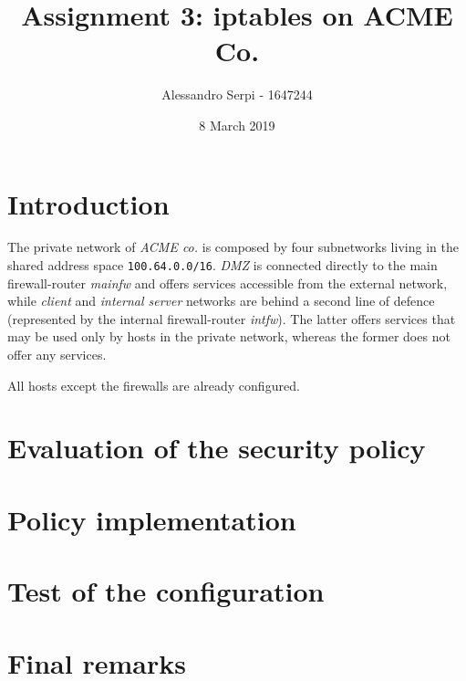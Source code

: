 \documentclass[draft]{homework}
\title{Assignment 3: iptables on ACME Co.}
\author{Alessandro Serpi - 1647244}
\date{8 March 2019}
\newcommand{\client}{\textit{client}\xspace}
\newcommand{\dmz}{\textit{DMZ}\xspace}
\newcommand{\ser}{\textit{internal server}\xspace}
\newcommand{\intfw}{\textit{intfw}\xspace}
\newcommand{\mainfw}{\textit{mainfw}\xspace}
\begin{document}
    \maketitle
    \tableofcontents
    
    \pagebreak
    \section{Introduction}
    The private network of \textit{ACME co.} is composed by four subnetworks living in the shared address space \texttt{100.64.0.0/16}. \dmz is connected directly to the main firewall-router \mainfw and offers services accessible from the external network, while \client and \ser networks are behind a second line of defence (represented by the internal firewall-router \intfw). The latter offers services that may be used only by hosts in the private network, whereas the former does not offer any services.
    
    All hosts except the firewalls are already configured. 
    
    
    \section{Evaluation of the security policy}
    
    
    \section{Policy implementation}
    
    
    \section{Test of the configuration}
    
    
    \section{Final remarks}
\end{document}
